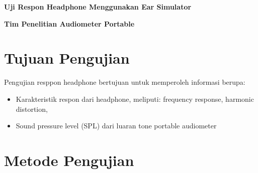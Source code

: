 \documentclass{article}
\begin{document}
	\begin{titlepage}
		\centering

		{
			\LARGE
			\bf
			Uji Respon Headphone Menggunakan Ear Simulator
		}

		\bigskip

		{
			\large
			\bf
			Tim Penelitian Audiometer Portable
		}

		\vfill
	\end{titlepage}

	\newpage


	\section{Tujuan Pengujian}
	Pengujian resppon headphone bertujuan untuk memperoleh informasi berupa:
	\begin{itemize}
		\item Karakteristik respon dari headphone, meliputi: frequency response, harmonic distortion,
		\item Sound pressure level (SPL) dari luaran tone portable audiometer
	\end{itemize}

	\section{Metode Pengujian}
\end{document}
